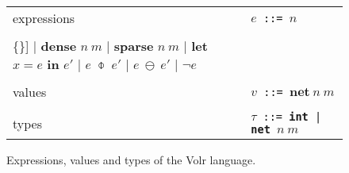 \begin{figure}
  \begin{tabular}[t]{l l}
    expressions & \texttt{$e$ ::= $n$} \\
    & \begin{minipage}{0.6\textwidth}
      \begin{Verbatim}[mathescape,commandchars=\\\{\}]
    | \textbf{dense} $n\ m$
    | \textbf{sparse} $n\ m$
    | \textbf{let} $x = e$ \textbf{in} $e'$
    | $e\ \obar\ e'$
    | $e\ \ominus\ e'$
    | $\neg e$
      \end{Verbatim} 
      \end{minipage} \\

    & \\ %

    values
    & \texttt{$v$ ::= $\textbf{net}\ n\ m$} \\
    
    & \\ %
    types
    & \texttt{$\tau$ ::= \textbf{int} | \textbf{net} $n\ m$} \\
  \end{tabular}

  \caption{Expressions, values and types of the Volr language.}
  \label{fig:volr-expr}
\end{figure}